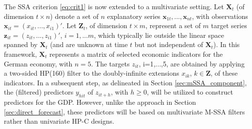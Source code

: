 \documentclass[11pt,a4paper]{article}
\begin{document}
The SSA criterion \eqref{eq:crit1} is now extended to a multivariate setting. Let $\mathbf{X}_t$ (of dimension $t\times n$) denote a set of $n$ explanatory series $\mathbf{x}_{1t},...,\mathbf{x}_{nt}$, with observations $\mathbf{x}_{it}=(x_{it},...,x_{i1})'$. Let $\mathbf{Z}_t$, of dimension $t\times m$, represent a set of $m$ target series $\mathbf{z}_{it}=(z_{it},...,z_{i1})'$, $i=1,...m$, which typically lie outside the linear space spanned by $\mathbf{X}_t$ (and are unknown at time $t$ but not independent of $\mathbf{X}_t$). In this framework, $\mathbf{X}_t$ represents a matrix of selected economic indicators for the German economy, with $n=5$. The targets $z_{it}$, i=1,...,5, are obtained by applying a two-sided HP(160) filter to the doubly-infinite extensions $x_{ik}$, $k\in \mathbf{Z}$, of these indicators. In a subsequent step, as delineated in Section \ref{sec:mSSA_component}, the (filtered) predictors $y_{hit}$ of $z_{it+h}$, with $h\geq 0$, will be utilized to construct predictors for the GDP. However, unlike the approach in Section \ref{sec:direct_forecast}, these predictors will be based on multivariate M-SSA filters rather than univariate HP-C designs. %
\end{document}
